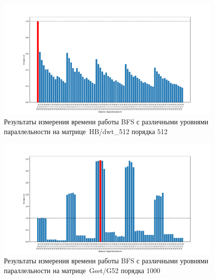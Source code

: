 \begin{landscape}
\begin{figure}
    \thispagestyle{empty} 
    \centering
    \includegraphics[height=0.8\textwidth]{figures/barPlot512.pdf}
    \caption{Результаты измерения времени работы BFS с различными уровнями параллельности на мат\-ри\-це~HB/dwt\_512 порядка 512\\}
    \label{fig:barPlot512}
\end{figure}
\end{landscape}

\begin{landscape}
\begin{figure}
    \thispagestyle{empty} 
    \centering
    \includegraphics[height=0.8\textwidth]{figures/barPlot1000.pdf}
    \caption{Результаты измерения времени работы BFS с различными уровнями параллельности на мат\-ри\-це~Gset/G52 порядка 1000\\}
    \label{fig:barPlot1000}
\end{figure}
\end{landscape}


